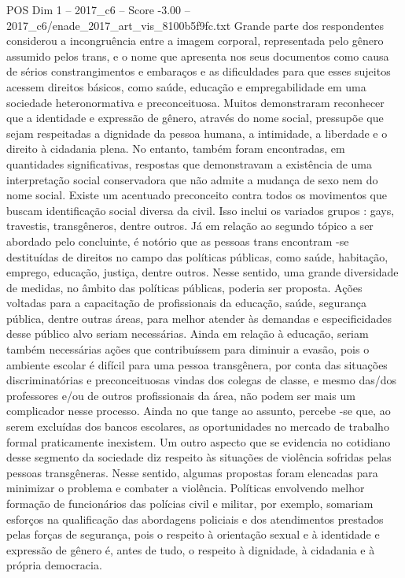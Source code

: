 \begin{textsample}{POS Dim 1 – 2017\_c6 – Score -3.00 – 2017\_c6/enade\_2017\_art\_vis\_8100b5f9fc.txt}
Grande parte dos respondentes considerou a incongruência entre a imagem corporal, representada pelo gênero assumido pelos trans, e o nome que apresenta nos seus documentos como causa de sérios constrangimentos e embaraços e as dificuldades para que esses sujeitos acessem direitos básicos, como saúde, educação e empregabilidade em uma sociedade heteronormativa e preconceituosa.
Muitos demonstraram reconhecer que a identidade e expressão de gênero, através do nome social, pressupõe que sejam respeitadas a dignidade da pessoa humana, a intimidade, a liberdade e o direito à cidadania plena.
No entanto, também foram encontradas, em quantidades significativas, respostas que demonstravam a existência de uma interpretação social conservadora que não admite a mudança de sexo nem do nome social.
Existe um acentuado preconceito contra todos os movimentos que buscam identificação social diversa da civil.
Isso inclui os variados grupos : gays, travestis, transgêneros, dentre outros.
Já em relação ao segundo tópico a ser abordado pelo concluinte, é notório que as pessoas trans encontram -se destituídas de direitos no campo das políticas públicas, como saúde, habitação, emprego, educação, justiça, dentre outros.
Nesse sentido, uma grande diversidade de medidas, no âmbito das políticas públicas, poderia ser proposta.
Ações voltadas para a capacitação de profissionais da educação, saúde, segurança pública, dentre outras áreas, para melhor atender às demandas e especificidades desse público alvo seriam necessárias.
Ainda em relação à educação, seriam também necessárias ações que contribuíssem para diminuir a evasão, pois o ambiente escolar é difícil para uma pessoa transgênera, por conta das situações discriminatórias e preconceituosas vindas dos colegas de classe, e mesmo das/dos professores e/ou de outros profissionais da área, não podem ser mais um complicador nesse processo.
Ainda no que tange ao assunto, percebe -se que, ao serem excluídas dos bancos escolares, as oportunidades no mercado de trabalho formal praticamente inexistem.
Um outro aspecto que se evidencia no cotidiano desse segmento da sociedade diz respeito às situações de violência sofridas pelas pessoas transgêneras.
Nesse sentido, algumas propostas foram elencadas para minimizar o problema e combater a violência.
Políticas envolvendo melhor formação de funcionários das polícias civil e militar, por exemplo, somariam esforços na qualificação das abordagens policiais e dos atendimentos prestados pelas forças de segurança, pois o respeito à orientação sexual e à identidade e expressão de gênero é, antes de tudo, o respeito à dignidade, à cidadania e à própria democracia.

\end{textsample}
